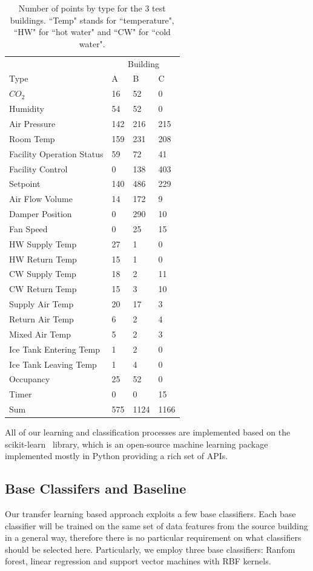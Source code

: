 \begin{table}[t]
\centering
\begin{tabular}{l | l l l}
\hline
& \multicolumn{3}{c}{Building} \\
Type & A & B & C\\
\hline\hline
$CO_{2}$ & 16 & 52 & 0\\
Humidity & 54 & 52 & 0\\
Air Pressure & 142 & 216 & 215\\
Room Temp & 159 & 231 & 208\\
Facility Operation Status & 59 & 72 & 41\\
Facility Control & 0 & 138 & 403\\
Setpoint & 140 & 486 & 229\\
Air Flow Volume & 14 & 172 & 9\\
Damper Position & 0 & 290 & 10\\
Fan Speed & 0 & 25 & 15\\
HW Supply Temp & 27 & 1 & 0\\
HW Return Temp & 15 & 1 & 0\\
CW Supply Temp & 18 & 2 & 11\\
CW Return Temp & 15 & 3 & 10\\
Supply Air Temp & 20 & 17 & 3\\
Return Air Temp & 6 & 2 & 4\\
Mixed Air Temp & 5 & 2 & 3\\
Ice Tank Entering Temp & 1 & 2 & 0\\
Ice Tank Leaving Temp & 1 & 4 & 0\\
Occupancy & 25 & 52 & 0\\
Timer & 0 & 0 & 15\\ \hline
Sum & 575 & 1124 & 1166\\ \hline
\end{tabular}
\caption{Number of points by type for the 3 test buildings. ``Temp" stands for ``temperature", ``HW" for ``hot water" and ``CW" for ``cold water".}
\label{table:num}
\end{table}


All of our learning and classification processes are implemented based on the scikit-learn~\cite{scikit} library, which is an open-source machine learning package 
implemented mostly in Python providing a rich set of APIs.


\subsection{Base Classifers and Baseline}
\label{sec:baseline}
Our transfer learning based approach exploits a few base classifiers. Each base classifier will be trained on the same set of data features from the source building in a general way, therefore there is no particular requirement on what classifiers should be selected here.
Particularly, we employ three base classifiers: Ranfom forest, linear regression and support vector machines with RBF kernels.


